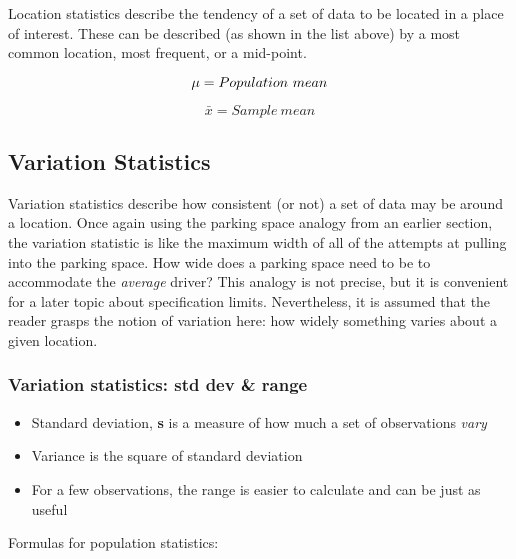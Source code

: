 Location statistics  describe the tendency of a set of data to be located in a place of interest.  These can be described (as shown in the list above) by a most common location, most frequent, or a mid-point.\\


\begin{equation} \mu \index{mean} = Population \  mean\end{equation}

\begin{equation} \bar{x} =  Sample \  mean\end{equation}


\subsection{Variation Statistics} 

Variation statistics describe how consistent (or not) a set of data may be around a location.  Once again using the parking space analogy from an earlier section, the variation statistic is like the maximum width of all of the attempts at pulling into the parking space.  How wide does a parking space need to be to accommodate the \textsl{average} driver?  This analogy is not precise, but it is convenient for a later topic about specification limits.  Nevertheless, it is assumed that the reader grasps the notion of variation here: how widely something varies about a given location.

\subsubsection{Variation statistics: std dev \& range}
   
  \begin{itemize}
  \item Standard deviation, \textbf{s}   is a measure of how much a set of observations \textsl{vary}
  \item Variance is the square of standard deviation
  \item For a few observations, the range is easier to calculate and can be just as useful
  \end{itemize}
  
  
Formulas for population statistics:\\

